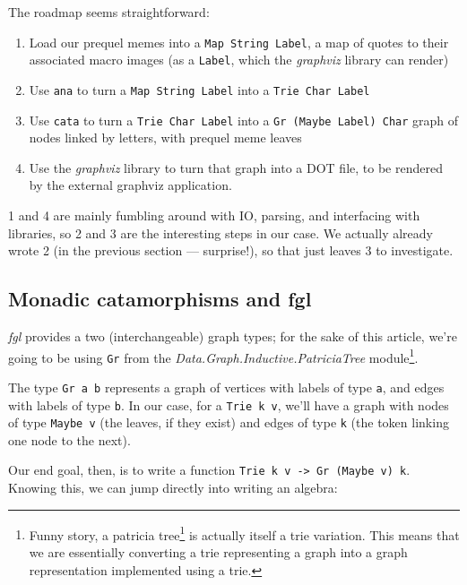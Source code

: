 \documentclass[]{article}
\renewcommand{\href}[2]{#2\footnote{\url{#1}}}
\begin{document}
The roadmap seems straightforward:

\begin{enumerate}
\def\labelenumi{\arabic{enumi}.}
\tightlist
\item
  Load our prequel memes into a \texttt{Map\ String\ Label}, a map of quotes to
  their associated macro images (as a \texttt{Label}, which the \emph{graphviz}
  library can render)
\item
  Use \texttt{ana} to turn a \texttt{Map\ String\ Label} into a
  \texttt{Trie\ Char\ Label}
\item
  Use \texttt{cata} to turn a \texttt{Trie\ Char\ Label} into a
  \texttt{Gr\ (Maybe\ Label)\ Char} graph of nodes linked by letters, with
  prequel meme leaves
\item
  Use the \emph{graphviz} library to turn that graph into a DOT file, to be
  rendered by the external graphviz application.
\end{enumerate}

1 and 4 are mainly fumbling around with IO, parsing, and interfacing with
libraries, so 2 and 3 are the interesting steps in our case. We actually already
wrote 2 (in the previous section --- surprise!), so that just leaves 3 to
investigate.

\subsection{Monadic catamorphisms and fgl}\label{monadic-catamorphisms-and-fgl}

\emph{fgl} provides a two (interchangeable) graph types; for the sake of this
article, we're going to be using \texttt{Gr} from the
\emph{Data.Graph.Inductive.PatriciaTree} module\footnote{Funny story, a
  \href{http://www.drdobbs.com/architecture-and-design/patricia-tries/208800854}{patricia
  tree} is actually itself a trie variation. This means that we are essentially
  converting a trie representing a graph into a graph representation implemented
  using a trie.}.

The type \texttt{Gr\ a\ b} represents a graph of vertices with labels of type
\texttt{a}, and edges with labels of type \texttt{b}. In our case, for a
\texttt{Trie\ k\ v}, we'll have a graph with nodes of type \texttt{Maybe\ v}
(the leaves, if they exist) and edges of type \texttt{k} (the token linking one
node to the next).

Our end goal, then, is to write a function
\texttt{Trie\ k\ v\ -\textgreater{}\ Gr\ (Maybe\ v)\ k}. Knowing this, we can
jump directly into writing an algebra:
\end{document}
